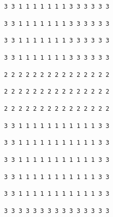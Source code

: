 \begin{figure}
\begin{minipage}[c][1\totalheight][t]{0.5\columnwidth}
				\begin{spacing}{0.3}
					\begin{center} \texttt{3 3 1 1 1 1 1 1 1 3 3 3 3 3 3} \par\end{center}
					\begin{center} \texttt{3 3 1 1 1 1 1 1 1 3 3 3 3 3 3} \par\end{center}
					\begin{center} \texttt{3 3 1 1 1 1 1 1 1 3 3 3 3 3 3} \par\end{center}
					\begin{center} \texttt{3 3 1 1 1 1 1 1 1 3 3 3 3 3 3} \par\end{center}
					\begin{center} \texttt{2 2 2 2 2 2 2 2 2 2 2 2 2 2 2} \par\end{center}
					\begin{center} \texttt{2 2 2 2 2 2 2 2 2 2 2 2 2 2 2} \par\end{center}
					\begin{center} \texttt{2 2 2 2 2 2 2 2 2 2 2 2 2 2 2} \par\end{center}
					\begin{center} \texttt{3 3 1 1 1 1 1 1 1 1 1 1 1 3 3} \par\end{center}
					\begin{center} \texttt{3 3 1 1 1 1 1 1 1 1 1 1 1 3 3} \par\end{center}
					\begin{center} \texttt{3 3 1 1 1 1 1 1 1 1 1 1 1 3 3} \par\end{center}
					\begin{center} \texttt{3 3 1 1 1 1 1 1 1 1 1 1 1 3 3} \par\end{center}
					\begin{center} \texttt{3 3 1 1 1 1 1 1 1 1 1 1 1 3 3} \par\end{center}
					\begin{center} \texttt{3 3 3 3 3 3 3 3 3 3 3 3 3 3 3} \par\end{center}

\end{spacing}
\end{minipage}
\end{figure}
